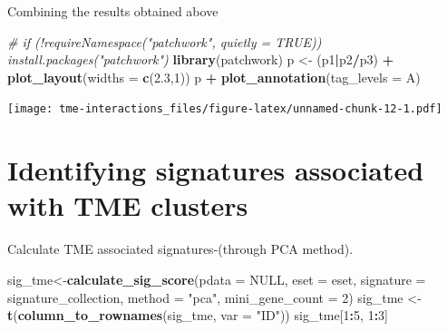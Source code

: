 \documentclass[
  12pt,
]{book}
\newenvironment{Shaded}{\begin{snugshade}}{\end{snugshade}}
\newcommand{\AttributeTok}[1]{\textcolor[rgb]{0.13,0.29,0.53}{#1}}
\newcommand{\CommentTok}[1]{\textcolor[rgb]{0.56,0.35,0.01}{\textit{#1}}}
\newcommand{\ConstantTok}[1]{\textcolor[rgb]{0.56,0.35,0.01}{#1}}
\newcommand{\DecValTok}[1]{\textcolor[rgb]{0.00,0.00,0.81}{#1}}
\newcommand{\FloatTok}[1]{\textcolor[rgb]{0.00,0.00,0.81}{#1}}
\newcommand{\FunctionTok}[1]{\textcolor[rgb]{0.13,0.29,0.53}{\textbf{#1}}}
\newcommand{\NormalTok}[1]{#1}
\newcommand{\OtherTok}[1]{\textcolor[rgb]{0.56,0.35,0.01}{#1}}
\newcommand{\SpecialCharTok}[1]{\textcolor[rgb]{0.81,0.36,0.00}{\textbf{#1}}}
\newcommand{\StringTok}[1]{\textcolor[rgb]{0.31,0.60,0.02}{#1}}
\begin{document}
Combining the results obtained above

\begin{Shaded}
\begin{Highlighting}[]
\CommentTok{\# if (!requireNamespace("patchwork", quietly = TRUE))   install.packages("patchwork")}
\FunctionTok{library}\NormalTok{(patchwork)}
\NormalTok{p }\OtherTok{\textless{}{-}}\NormalTok{ (p1}\SpecialCharTok{|}\NormalTok{p2}\SpecialCharTok{/}\NormalTok{p3) }\SpecialCharTok{+} \FunctionTok{plot\_layout}\NormalTok{(}\AttributeTok{widths =} \FunctionTok{c}\NormalTok{(}\FloatTok{2.3}\NormalTok{,}\DecValTok{1}\NormalTok{))}
\NormalTok{p }\SpecialCharTok{+} \FunctionTok{plot\_annotation}\NormalTok{(}\AttributeTok{tag\_levels =} \StringTok{\textquotesingle{}A\textquotesingle{}}\NormalTok{)}
\end{Highlighting}
\end{Shaded}

\texttt{[image: tme-interactions\_files/figure-latex/unnamed-chunk-12-1.pdf]}

\hypertarget{identifying-signatures-associated-with-tme-clusters}{%
\section{Identifying signatures associated with TME clusters}\label{identifying-signatures-associated-with-tme-clusters}}

Calculate TME associated signatures-(through PCA method).

\begin{Shaded}
\begin{Highlighting}[]
\NormalTok{sig\_tme}\OtherTok{\textless{}{-}}\FunctionTok{calculate\_sig\_score}\NormalTok{(}\AttributeTok{pdata           =} \ConstantTok{NULL}\NormalTok{,}
                             \AttributeTok{eset            =}\NormalTok{ eset,}
                             \AttributeTok{signature       =}\NormalTok{ signature\_collection,}
                             \AttributeTok{method          =} \StringTok{"pca"}\NormalTok{,}
                             \AttributeTok{mini\_gene\_count =} \DecValTok{2}\NormalTok{)}
\NormalTok{sig\_tme }\OtherTok{\textless{}{-}} \FunctionTok{t}\NormalTok{(}\FunctionTok{column\_to\_rownames}\NormalTok{(sig\_tme, }\AttributeTok{var =} \StringTok{"ID"}\NormalTok{))}
\NormalTok{sig\_tme[}\DecValTok{1}\SpecialCharTok{:}\DecValTok{5}\NormalTok{, }\DecValTok{1}\SpecialCharTok{:}\DecValTok{3}\NormalTok{]}
\end{Highlighting}
\end{Shaded}
\end{document}
